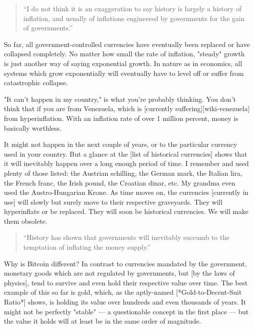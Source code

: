 \begin{quotation}
``I do not think it is an exaggeration to say history is largely a
history of inflation, and usually of inflations engineered by
governments for the gain of governments.''
\end{quotation}

So far, all government-controlled currencies have eventually been
replaced or have collapsed completely. No matter how small the rate of
inflation, "steady" growth is just another way of saying exponential
growth. In nature as in economics, all systems which grow exponentially
will eventually have to level off or suffer from catastrophic collapse.

"It can't happen in my country," is what you're probably thinking. You
don't think that if you are from Venezuela, which is [currently
suffering][wiki-venezuela] from hyperinflation. With an inflation rate of over 1 million
percent, money is basically worthless.

It might not happen in the next couple of years, or to the particular
currency used in your country. But a glance at the [list of historical
currencies] shows that it will inevitably happen over a long enough period of
time. I remember and used plenty of those listed: the Austrian
schilling, the German mark, the Italian lira, the French franc, the
Irish pound, the Croatian dinar, etc. My grandma even used the
Austro-Hungarian Krone. As time moves on, the currencies [currently in
use] will slowly but surely move to their respective graveyards. They
will hyperinflate or be replaced. They will soon be historical
currencies. We will make them obsolete.

\begin{quotation}
``History has shown that governments will inevitably succumb to the
temptation of inflating the money supply.''
\end{quotation}

Why is Bitcoin different? In contrast to currencies mandated by the
government, monetary goods which are not regulated by governments, but
[by the laws of physics], tend to survive and even hold their respective
value over time. The best example of this so far is gold, which, as the
aptly-named [*Gold-to-Decent-Suit Ratio*] shows, is holding its value
over hundreds and even thousands of years. It might not be perfectly
"stable" --- a questionable concept in the first place --- but the value
it holds will at least be in the same order of magnitude.

